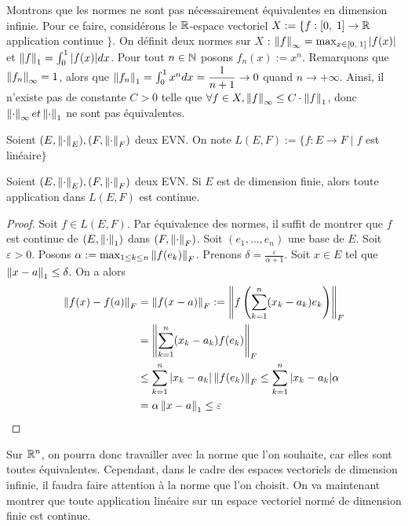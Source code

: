 \begin{exemple}
    Montrons que les normes ne sont pas nécessairement équivalentes en dimension infinie. Pour ce faire, considérons le $\mathbb{R}$-espace vectoriel $X:=\{f:[0,\;1]\to\mathbb{R} $ application continue $\}$. On définit deux normes sur $X$ : $\left\| f \right\|_\infty = \max_{x\in [0,\;1]}|f(x)|$ et $\left\| f \right\|_1 = \int_0^1|f(x)|dx$. Pour tout $n\in\mathbb{N}$ posons $f_n(x) := x^n$. Remarquons que $\left\| f_n \right\|_\infty = 1$, alors que $\left\| f_n \right\|_1 = \int_0^1x^ndx = \dfrac 1 {n+1} \to 0$ quand $n\to +\infty$. Ainsi, il n'existe pas de constante $C>0$ telle que $\forall f\in X, \left\| f \right\|_\infty\leq C\cdot\left\| f \right\| _1$, donc $\left\| \cdot \right\|_\infty et \left\| \cdot \right\| _1$ ne sont pas équivalentes.
\end{exemple}
\begin{notation}
    Soient $(E,\left\| \cdot \right\|_E),(F,\left\| \cdot \right\|_F)$ deux EVN.
    On note $L(E,F):=\{f:E\to F\mid f$ est linéaire$\}$
\end{notation}
\begin{proposition}
    Soient $(E,\left\| \cdot \right\|_E),(F,\left\| \cdot \right\|_F)$ deux EVN. Si $E$ est de dimension finie, alors toute application dans $L(E,F)$ est continue.
\end{proposition}
\begin{proof}
    Soit $f\in L(E,F)$.
    Par équivalence des normes, il suffit de montrer que $f$ est continue de $(E,\left\| \cdot \right\| _1)$ dans $(F,\left\| \cdot \right\|_F)$. Soit $(e_1,\dots,e_n)$ une base de $E$. Soit $\varepsilon>0$. Posons $\alpha := \max_{1\leq k \leq n}\left\| f(e_k) \right\|_F$. Prenons $\delta = \frac \varepsilon {\alpha+1}$.
    Soit $x\in E$ tel que $\left\| x-a \right\|_1\leq \delta$. On a alors
    \begin{align*}
    \left\| f(x)-f(a) \right\|_F & =\left\| f(x-a) \right\|_F := \left\| f\left(\sum_{k=1}^n(x_k-a_k)e_k\right) \right\|_F\\
    &=\left\| \sum_{k=1}^n(x_k-a_k)f(e_k) \right\|_F\\
    &\leq \sum_{k=1}^n|x_k-a_k|\left\| f(e_k) \right\|_F\leq \sum_{k=1}^n|x_k-a_k|\alpha\\
    &=\alpha\left\| x-a \right\|_1\leq\varepsilon
    \end{align*}
\end{proof}

Sur $\mathbb{R}^n$, on pourra donc travailler avec la norme que l'on souhaite, car elles sont toutes équivalentes. Cependant, dans le cadre des espaces vectoriels de dimension infinie, il faudra faire attention à la norme que l'on choisit.
On va maintenant montrer que toute application linéaire sur un espace vectoriel normé de dimension finie est continue.

